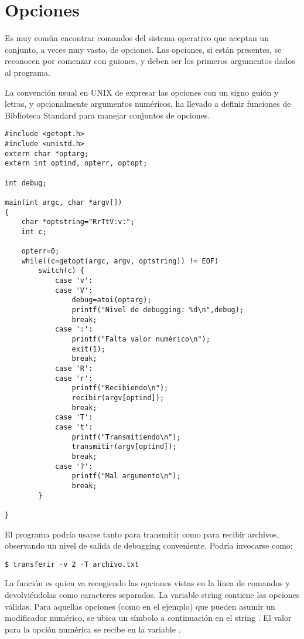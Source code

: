 \section{Opciones}
Es muy común encontrar comandos del sistema operativo que aceptan un conjunto,
a veces muy vasto, de opciones. Las opciones, si están presentes, se reconocen
por comenzar con guiones, y deben ser los primeros argumentos dados al
programa.

La convención usual en UNIX de expresar las opciones con un signo guión y
letras, y opcionalmente argumentos numéricos, ha llevado a definir funciones de
Biblioteca Standard para manejar conjuntos de opciones.

\begin{ejemplo}
\begin{lstlisting}
#include <getopt.h>
#include <unistd.h>
extern char *optarg;
extern int optind, opterr, optopt;

int debug;

main(int argc, char *argv[])
{
    char *optstring="RrTtV:v:";
    int c;

    opterr=0;
    while((c=getopt(argc, argv, optstring)) != EOF)
        switch(c) {
            case 'v':
            case 'V':
                debug=atoi(optarg);
                printf("Nivel de debugging: %d\n",debug);
                break;
            case ':':
                printf("Falta valor numérico\n");
                exit(1);
                break;
            case 'R':
            case 'r':
                printf("Recibiendo\n");
                recibir(argv[optind]);
                break;
            case 'T':
            case 't':
                printf("Transmitiendo\n");
                transmitir(argv[optind]);
                break;
            case '?':
                printf("Mal argumento\n");
                break;
        }

}	
\end{lstlisting}

El programa podría usarse tanto para transmitir como para recibir archivos,
observando un nivel de salida de debugging conveniente. Podría invocarse como:

\begin{lstlisting}
$ transferir -v 2 -T archivo.txt
\end{lstlisting}
\end{ejemplo}

La función  es quien va recogiendo las opciones vistas en la línea de
comandos y devolviéndolas como caracteres separados. La variable string
 contiene las opciones válidas. Para aquellas opciones (como  en el
ejemplo) que pueden asumir un modificador numérico, se ubica un símbolo  a continuación en el string . El valor para la opción numérica
se recibe en la variable .

